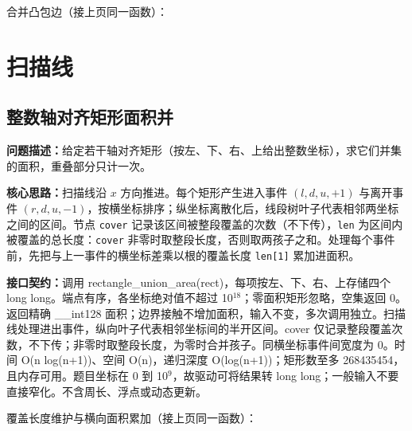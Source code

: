 \Needspace{400pt}



\newpage

\noindent 合并凸包边（接上页同一函数）：



\Needspace{180pt}

\chapter{扫描线}

\section{整数轴对齐矩形面积并}\label{compact-rectangle_union_area}

\noindent\textbf{问题描述：}\allowbreak 给定若干轴对齐矩形（按左、下、右、上给出整数坐标），求它们并集的面积，重叠部分只计一次。

\textbf{核心思路：}\allowbreak 扫描线沿 $x$ 方向推进。每个矩形产生进入事件 $(l,d,u,+1)$ 与离开事件 $(r,d,u,-1)$，按横坐标排序；纵坐标离散化后，线段树叶子代表相邻两坐标之间的区间。节点 \texttt{cover} 记录该区间被整段覆盖的次数（不下传），\texttt{len} 为区间内被覆盖的总长度：\texttt{cover} 非零时取整段长度，否则取两孩子之和。处理每个事件前，先把与上一事件的横坐标差乘以根的覆盖长度 \texttt{len[1]} 累加进面积。



{\sloppy{}\noindent\textbf{接口契约：}调用 rectangle\_union\_area(rect)，每项按左、下、右、上存储四个 long long。端点有序，各坐标绝对值不超过 10$^{18}$；零面积矩形忽略，空集返回 0。返回精确 \_\_int128 面积；边界接触不增加面积，输入不变，多次调用独立。扫描线处理进出事件，纵向叶子代表相邻坐标间的半开区间。cover 仅记录整段覆盖次数，不下传；非零时取整段长度，为零时合并孩子。同横坐标事件间宽度为 0。时间 O(n log(n+1))、空间 O(n)，递归深度 O(log(n+1))；矩形数至多 268435454，且内存可用。题目坐标在 0 到 10$^{9}$，故驱动可将结果转 long long；一般输入不要直接窄化。不含周长、浮点或动态更新。\par}

\Needspace{347pt}



\newpage

\noindent 覆盖长度维护与横向面积累加（接上页同一函数）：

